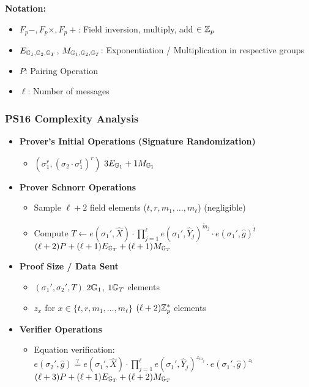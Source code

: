 \newpage

\noindent\textbf{Notation:}
\begin{itemize}
    \item $F_p-, F_p \times, F_p +$: Field inversion, multiply, add $\in \mathbb{Z}_p$
    \item $E_{\mathbb{G}_1, \mathbb{G}_2, \mathbb{G}_T}$, $M_{\mathbb{G}_1, \mathbb{G}_2, \mathbb{G}_T}$: Exponentiation / Multiplication in respective groups
    \item $P$: Pairing Operation
    \item $\ell$: Number of messages
\end{itemize}


\subsubsection{PS16 Complexity Analysis \cite{sako_short_2016}}
\begin{itemize}
    \item \textbf{Prover's Initial Operations (Signature Randomization)}
    \begin{itemize}
        \item $(\sigma_1^r, (\sigma_2 \cdot \sigma_1^t)^r)$ \qquad $3E_{\mathbb{G}_1} + 1M_{\mathbb{G}_1}$
    \end{itemize}
    
\item \textbf{Prover Schnorr Operations}
    \begin{itemize}
        \item Sample $\ell+2$ field elements ($t, r, m_1,\ldots,m_\ell$) \qquad (negligible)
        \item Compute $T \gets e(\sigma_1',\hat{X}) \cdot \prod_{j=1}^\ell e(\sigma_1', \widehat{Y}_j)^{\tilde{m}_j} \cdot e(\sigma_1', \hat{g})^{\tilde{t}}$ \qquad $(\ell+2)P + (\ell+1)E_{\mathbb{G}_T} + (\ell+1)M_{\mathbb{G}_T}$
    \end{itemize}
    
\item \textbf{Proof Size / Data Sent}
    \begin{itemize}
        \item $(\sigma_1', \sigma_2', T)$ \qquad $2\mathbb{G}_1$, $1\mathbb{G}_T$ elements
        \item $z_x$ for $x \in \{t,r,m_1,\ldots,m_\ell\}$ \qquad $(\ell+2)\mathbb{Z}_p^*$ elements
    \end{itemize}
    
\item \textbf{Verifier Operations}
    \begin{itemize}
        \item Equation verification: $e(\sigma_2', \hat{g}) \stackrel{?}{=} e(\sigma_1',\hat{X}) \cdot \prod_{j=1}^\ell e(\sigma_1', \widehat{Y}_j)^{z_{m_j}} \cdot e(\sigma_1', \hat{g})^{z_t}$ \qquad $(\ell+3)P + (\ell+1)E_{\mathbb{G}_T} + (\ell+2)M_{\mathbb{G}_T}$
    \end{itemize}
\end{itemize}


